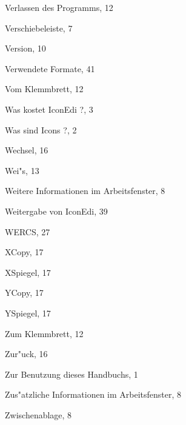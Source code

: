 \begin{theindex}
  \indexspace

  \item Verlassen des Programms, 12
  \item Verschiebeleiste, 7
  \item Version, 10
  \item Verwendete Formate, 41
  \item Vom Klemmbrett, 12

  \indexspace

  \item Was kostet IconEdi ?, 3
  \item Was sind Icons ?, 2
  \item Wechsel, 16
  \item Wei"s, 13
  \item Weitere Informationen im Arbeitsfenster, 8
  \item Weitergabe von IconEdi, 39
  \item WERCS, 27

  \indexspace

  \item XCopy, 17
  \item XSpiegel, 17

  \indexspace

  \item YCopy, 17
  \item YSpiegel, 17

  \indexspace

  \item Zum Klemmbrett, 12
  \item Zur"uck, 16
  \item Zur Benutzung dieses Handbuchs, 1
  \item Zus"atzliche Informationen im Arbeitsfenster, 8
  \item Zwischenablage, 8

\end{theindex}
\else
